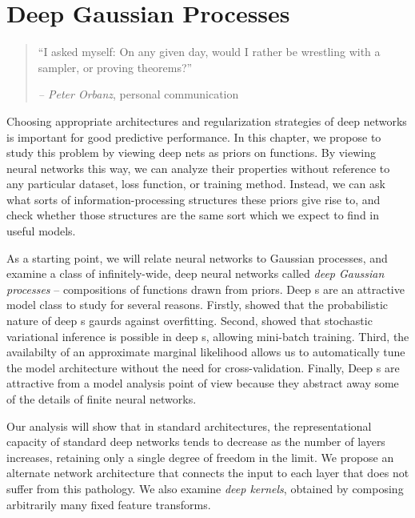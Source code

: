 
\inbpdocument


\chapter{Deep Gaussian Processes}
\label{ch:deep-limits}

\begin{quotation}
``I asked myself: On any given day, would I rather be wrestling with a sampler, or proving theorems?''

\hspace*{\fill} \emph{ -- Peter Orbanz}, personal communication
\end{quotation}




Choosing appropriate architectures and regularization strategies of deep networks is important for good predictive performance.
In this chapter, we propose to study this problem by viewing deep nets as priors on functions.
By viewing neural networks this way, we can analyze their properties without reference to any particular dataset, loss function, or training method.
Instead, we can ask what sorts of information-processing structures these priors give rise to, and check whether those structures are the same sort which we expect to find in useful models.

As a starting point, we will relate neural networks to Gaussian processes, and examine a class of infinitely-wide, deep neural networks called \emph{deep Gaussian processes} -- compositions of functions drawn from \gp{} priors.
Deep \gp{}s are an attractive model class to study for several reasons.
Firstly, \citet{damianou2012deep} showed that the probabilistic nature of deep \gp{}s gaurds against overfitting.
Second, \citet{hensman2014deep} showed that stochastic variational inference is possible in deep \gp{}s, allowing mini-batch training.
Third, the availabilty of an approximate marginal likelihood allows us to automatically tune the model architecture without the need for cross-validation.
Finally, Deep \gp{}s are attractive from a model analysis point of view because they abstract away some of the details of finite neural networks. %

Our analysis will show that in standard architectures, the representational capacity of standard deep networks tends to decrease as the number of layers increases, retaining only a single degree of freedom in the limit.
We propose an alternate network architecture that connects the input to each layer that does not suffer from this pathology.
We also examine \emph{deep kernels}, obtained by composing arbitrarily many fixed feature transforms.

